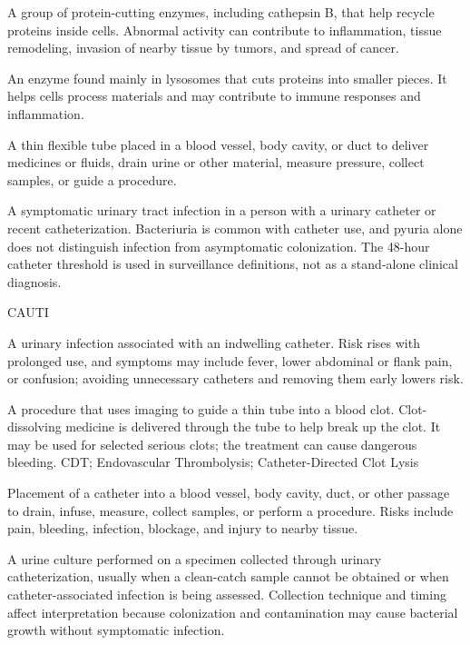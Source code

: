  A group of protein-cutting enzymes, including cathepsin B, that help recycle proteins inside cells. Abnormal activity can contribute to inflammation, tissue remodeling, invasion of nearby tissue by tumors, and spread of cancer.

 An enzyme found mainly in lysosomes that cuts proteins into smaller pieces. It helps cells process materials and may contribute to immune responses and inflammation.

 A thin flexible tube placed in a blood vessel, body cavity, or duct to deliver medicines or fluids, drain urine or other material, measure pressure, collect samples, or guide a procedure.

 A symptomatic urinary
tract infection in a person with a urinary catheter or recent catheterization.
Bacteriuria is common with catheter use, and pyuria alone does not distinguish
infection from asymptomatic colonization. The 48-hour catheter threshold is
used in surveillance definitions, not as a stand-alone clinical diagnosis.

\synonyms
CAUTI

 A urinary infection associated with an indwelling catheter. Risk rises with prolonged use, and symptoms may include fever, lower abdominal or flank pain, or confusion; avoiding unnecessary catheters and removing them early lowers risk.

 A procedure that uses imaging to guide a thin tube into a blood clot. Clot-dissolving medicine is delivered through the tube to help break up the clot. It may be used for selected serious clots; the treatment can cause dangerous bleeding.
\synonyms
CDT; Endovascular Thrombolysis; Catheter-Directed Clot Lysis


 Placement of a catheter into a blood vessel, body cavity, duct, or other passage to drain, infuse, measure, collect samples, or perform a procedure. Risks include pain, bleeding, infection, blockage, and injury to nearby tissue.

 A urine culture performed on a specimen collected through urinary catheterization, usually when a clean-catch sample cannot be obtained or when catheter-associated infection is being assessed. Collection technique and timing affect interpretation because colonization and contamination may cause bacterial growth without symptomatic infection.

